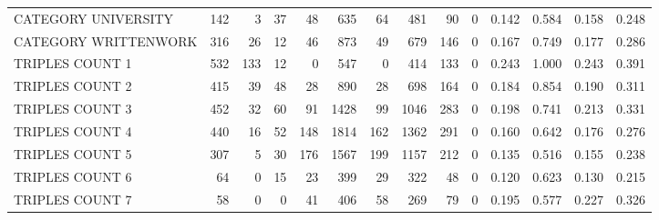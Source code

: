 \begin{tabular}{lrrrrrrrrrllll}
 CATEGORY UNIVERSITY      &             142 &             3 &              37 &              48 &             635 &   64 &  481 &   90 &    0 & 0.142 & 0.584 & 0.158 & 0.248 \\
 CATEGORY WRITTENWORK     &             316 &            26 &              12 &              46 &             873 &   49 &  679 &  146 &    0 & 0.167 & 0.749 & 0.177 & 0.286 \\
 TRIPLES COUNT 1          &             532 &           133 &              12 &               0 &             547 &    0 &  414 &  133 &    0 & 0.243 & 1.000 & 0.243 & 0.391 \\
 TRIPLES COUNT 2          &             415 &            39 &              48 &              28 &             890 &   28 &  698 &  164 &    0 & 0.184 & 0.854 & 0.190 & 0.311 \\
 TRIPLES COUNT 3          &             452 &            32 &              60 &              91 &            1428 &   99 & 1046 &  283 &    0 & 0.198 & 0.741 & 0.213 & 0.331 \\
 TRIPLES COUNT 4          &             440 &            16 &              52 &             148 &            1814 &  162 & 1362 &  291 &    0 & 0.160 & 0.642 & 0.176 & 0.276 \\
 TRIPLES COUNT 5          &             307 &             5 &              30 &             176 &            1567 &  199 & 1157 &  212 &    0 & 0.135 & 0.516 & 0.155 & 0.238 \\
 TRIPLES COUNT 6          &              64 &             0 &              15 &              23 &             399 &   29 &  322 &   48 &    0 & 0.120 & 0.623 & 0.130 & 0.215 \\
 TRIPLES COUNT 7          &              58 &             0 &               0 &              41 &             406 &   58 &  269 &   79 &    0 & 0.195 & 0.577 & 0.227 & 0.326 \\
\hline
\end{tabular}
